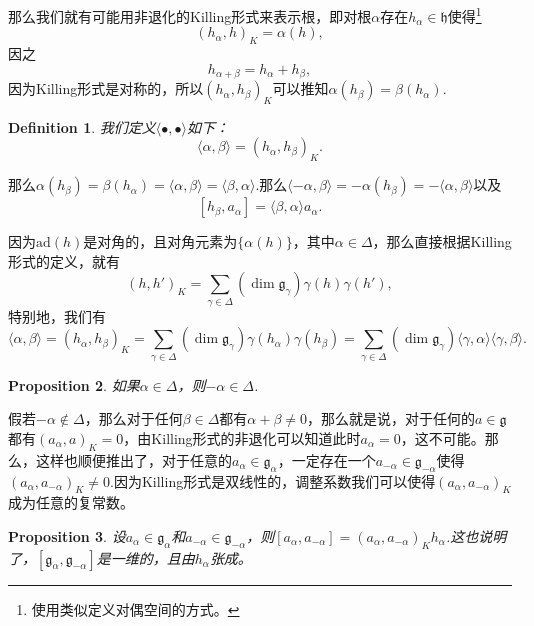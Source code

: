 \documentclass[9pt]{extbook}
\theoremstyle{plain}
\newtheorem{defi}{Definition}
\newtheorem{pro}[defi]{Proposition}
\newcommand{\lag}{{\mathfrak{g}}}  %
\newcommand{\ad}{{\mathrm{ad}}}
\begin{document}
那么我们就有可能用非退化的Killing形式来表示根，即对根$\alpha$存在$h_\alpha\in\mathfrak{h}$使得\footnote{使用类似定义对偶空间的方式。}
\[
	(h_\alpha,h)_K=\alpha(h),
\]
因之
\[
	h_{\alpha+\beta}=h_\alpha+h_\beta,
\]
因为Killing形式是对称的，所以$(h_\alpha,h_\beta)_K$可以推知$\alpha(h_\beta)=\beta(h_\alpha)$.
\begin{defi}
我们定义$\langle \bullet,\bullet \rangle$如下：
\[
	\langle \alpha,\beta \rangle=(h_\alpha,h_\beta)_K.
\]
\end{defi}
那么$\alpha(h_\beta)=\beta(h_\alpha)=\langle \alpha,\beta \rangle=\langle \beta,\alpha \rangle$.那么$\langle -\alpha,\beta \rangle=-\alpha(h_\beta)=-\langle \alpha,\beta \rangle$以及
\[
	[h_\beta,a_\alpha]=\langle \beta,\alpha \rangle a_\alpha.
\]

因为$\ad(h)$是对角的，且对角元素为$\{\alpha(h)\}$，其中$\alpha\in\Delta$，那么直接根据Killing形式的定义，就有
\[
	(h,h')_K=\sum_{\gamma \in \Delta}(\dim \lag_\gamma)\gamma(h)\gamma(h'),
\]
特别地，我们有
\[
	\langle \alpha,\beta \rangle=(h_\alpha,h_\beta)_K=\sum_{\gamma \in \Delta}(\dim \lag_\gamma)\gamma(h_\alpha)\gamma(h_\beta)=\sum_{\gamma \in \Delta}(\dim \lag_\gamma)\langle \gamma,\alpha\rangle\langle \gamma,\beta\rangle.
\]

\begin{pro}
如果$\alpha\in\Delta$，则$-\alpha\in\Delta$.
\end{pro}
假若$-\alpha\notin\Delta$，那么对于任何$\beta\in\Delta$都有$\alpha+\beta\neq 0$，那么就是说，对于任何的$a\in \lag$都有$(a_\alpha,a)_K=0$，由Killing形式的非退化可以知道此时$a_\alpha=0$，这不可能。那么，这样也顺便推出了，对于任意的$a_\alpha\in\lag_{\alpha}$，一定存在一个$a_{-\alpha}\in\lag_{-\alpha}$使得$(a_\alpha,a_{-\alpha})_K\neq 0$.因为Killing形式是双线性的，调整系数我们可以使得$(a_\alpha,a_{-\alpha})_K$成为任意的复常数。

\begin{pro}
设$a_\alpha \in \lag_\alpha$和$a_{-\alpha} \in \lag_{-\alpha}$，则$[a_{\alpha},a_{-\alpha}]=(a_{\alpha},a_{-\alpha})_Kh_\alpha$.这也说明了，$[\lag_{\alpha},\lag_{-\alpha}]$是一维的，且由$h_\alpha$张成。
\end{pro}
\end{document}
